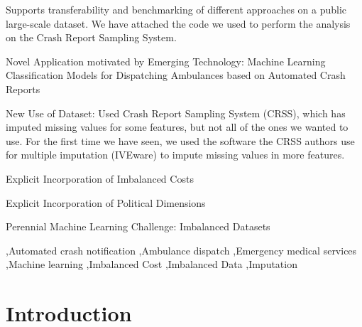 \documentclass[fleqn]{cas-sc}
\begin{document}

\begin{highlights}
	\item  Supports transferability and benchmarking of different approaches on a public large-scale dataset.  We have attached the code we used to perform the analysis on the Crash Report Sampling System.  
	\item Novel Application motivated by Emerging Technology:  Machine Learning Classification Models for Dispatching Ambulances based on Automated Crash Reports
	\item New Use of Dataset:  Used Crash Report Sampling System (CRSS), which has imputed missing values for some features, but not all of the ones we wanted to use.  For the first time we have seen, we used the software the CRSS authors use for multiple imputation (IVEware) to impute missing values in more features.  
	\item Explicit Incorporation of Imbalanced Costs
	\item Explicit Incorporation of Political Dimensions
	\item Perennial Machine Learning Challenge:  Imbalanced Datasets
\end{highlights}

\begin{keywords}
 \sep Automated crash notification 
 \sep Ambulance dispatch 
 \sep Emergency medical services  
 \sep Machine learning 
 \sep Imbalanced Cost 
 \sep Imbalanced Data 
 \sep Imputation
\end{keywords}

\maketitle


%
%
%

%

\section{Introduction}\label{sec:Introduction}

\end{document}
